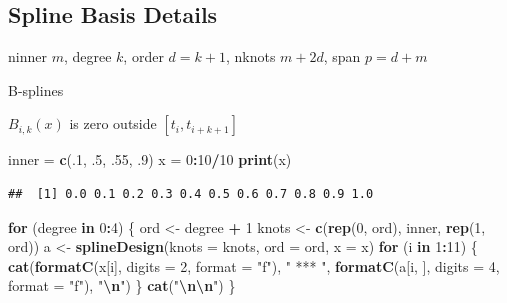\documentclass[
  12pt,
]{article}
\newenvironment{Shaded}{\begin{snugshade}}{\end{snugshade}}
\newcommand{\AttributeTok}[1]{\textcolor[rgb]{0.13,0.29,0.53}{#1}}
\newcommand{\ControlFlowTok}[1]{\textcolor[rgb]{0.13,0.29,0.53}{\textbf{#1}}}
\newcommand{\DecValTok}[1]{\textcolor[rgb]{0.00,0.00,0.81}{#1}}
\newcommand{\FunctionTok}[1]{\textcolor[rgb]{0.13,0.29,0.53}{\textbf{#1}}}
\newcommand{\NormalTok}[1]{#1}
\newcommand{\OtherTok}[1]{\textcolor[rgb]{0.56,0.35,0.01}{#1}}
\newcommand{\SpecialCharTok}[1]{\textcolor[rgb]{0.81,0.36,0.00}{\textbf{#1}}}
\newcommand{\StringTok}[1]{\textcolor[rgb]{0.31,0.60,0.02}{#1}}
\begin{document}
\subsection{Spline Basis Details}\label{spline-basis-details}

ninner \(m\),
degree \(k\),
order \(d=k+1\),
nknots \(m + 2d\),
span \(p=d+m\)

B-splines

\(B_{i,k}(x)\) is zero outside \([t_i,t_{i+k+1}]\)

\begin{Shaded}
\begin{Highlighting}[]
\NormalTok{inner }\OtherTok{=} \FunctionTok{c}\NormalTok{(.}\DecValTok{1}\NormalTok{, .}\DecValTok{5}\NormalTok{, .}\DecValTok{55}\NormalTok{, .}\DecValTok{9}\NormalTok{)}
\NormalTok{x }\OtherTok{=} \DecValTok{0}\SpecialCharTok{:}\DecValTok{10}\SpecialCharTok{/}\DecValTok{10}
\FunctionTok{print}\NormalTok{(x)}
\end{Highlighting}
\end{Shaded}

\begin{verbatim}
##  [1] 0.0 0.1 0.2 0.3 0.4 0.5 0.6 0.7 0.8 0.9 1.0
\end{verbatim}

\begin{Shaded}
\begin{Highlighting}[]
\ControlFlowTok{for}\NormalTok{ (degree }\ControlFlowTok{in} \DecValTok{0}\SpecialCharTok{:}\DecValTok{4}\NormalTok{) \{}
\NormalTok{  ord }\OtherTok{\textless{}{-}}\NormalTok{ degree }\SpecialCharTok{+} \DecValTok{1}
\NormalTok{  knots }\OtherTok{\textless{}{-}} \FunctionTok{c}\NormalTok{(}\FunctionTok{rep}\NormalTok{(}\DecValTok{0}\NormalTok{, ord), inner, }\FunctionTok{rep}\NormalTok{(}\DecValTok{1}\NormalTok{, ord))}
\NormalTok{  a }\OtherTok{\textless{}{-}} \FunctionTok{splineDesign}\NormalTok{(}\AttributeTok{knots =}\NormalTok{ knots, }\AttributeTok{ord =}\NormalTok{ ord, }\AttributeTok{x =}\NormalTok{ x)}
  \ControlFlowTok{for}\NormalTok{ (i }\ControlFlowTok{in} \DecValTok{1}\SpecialCharTok{:}\DecValTok{11}\NormalTok{) \{}
    \FunctionTok{cat}\NormalTok{(}\FunctionTok{formatC}\NormalTok{(x[i], }\AttributeTok{digits =} \DecValTok{2}\NormalTok{, }\AttributeTok{format =} \StringTok{"f"}\NormalTok{), }\StringTok{" *** "}\NormalTok{, }
        \FunctionTok{formatC}\NormalTok{(a[i, ], }\AttributeTok{digits =} \DecValTok{4}\NormalTok{, }\AttributeTok{format =} \StringTok{"f"}\NormalTok{), }\StringTok{"}\SpecialCharTok{\textbackslash{}n}\StringTok{"}\NormalTok{)}
\NormalTok{  \}}
  \FunctionTok{cat}\NormalTok{(}\StringTok{"}\SpecialCharTok{\textbackslash{}n\textbackslash{}n}\StringTok{"}\NormalTok{)}
\NormalTok{\}}
\end{Highlighting}
\end{Shaded}
\end{document}
